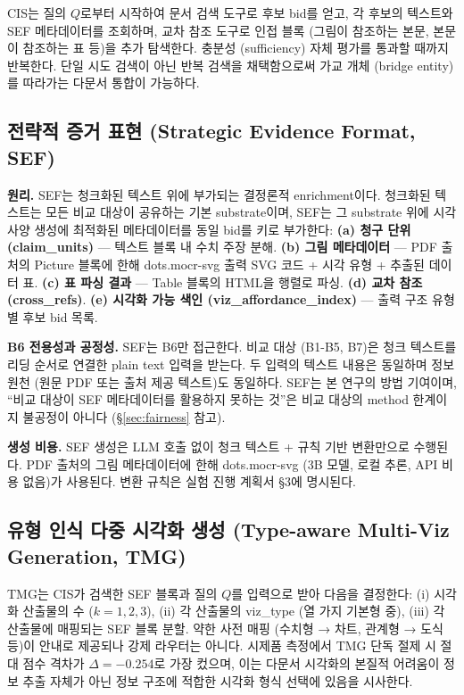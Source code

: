 \documentclass[11pt]{article}
\begin{document}
CIS는 질의 $Q$로부터 시작하여 문서 검색 도구로 후보 bid를 얻고, 각 후보의 텍스트와 SEF 메타데이터를 조회하며, 교차 참조 도구로 인접 블록 (그림이 참조하는 본문, 본문이 참조하는 표 등)을 추가 탐색한다. 충분성 (sufficiency) 자체 평가를 통과할 때까지 반복한다. 단일 시도 검색이 아닌 반복 검색을 채택함으로써 가교 개체 (bridge entity)를 따라가는 다문서 통합이 가능하다.

\subsection{전략적 증거 표현 (Strategic Evidence Format, SEF)}
\label{sec:sef}

\textbf{원리.} SEF는 청크화된 텍스트 위에 부가되는 결정론적 enrichment이다. 청크화된 텍스트는 모든 비교 대상이 공유하는 기본 substrate이며, SEF는 그 substrate 위에 시각 사양 생성에 최적화된 메타데이터를 동일 bid를 키로 부가한다: \textbf{(a) 청구 단위 (claim\_units)} — 텍스트 블록 내 수치 주장 분해. \textbf{(b) 그림 메타데이터} — PDF 출처의 Picture 블록에 한해 dots.mocr-svg 출력 SVG 코드 + 시각 유형 + 추출된 데이터 표. \textbf{(c) 표 파싱 결과} — Table 블록의 HTML을 행렬로 파싱. \textbf{(d) 교차 참조 (cross\_refs)}. \textbf{(e) 시각화 가능 색인 (viz\_affordance\_index)} — 출력 구조 유형별 후보 bid 목록.

\textbf{B6 전용성과 공정성.} SEF는 B6만 접근한다. 비교 대상 (B1-B5, B7)은 청크 텍스트를 리딩 순서로 연결한 plain text 입력을 받는다. 두 입력의 텍스트 내용은 동일하며 정보 원천 (원문 PDF 또는 출처 제공 텍스트)도 동일하다. SEF는 본 연구의 방법 기여이며, ``비교 대상이 SEF 메타데이터를 활용하지 못하는 것''은 비교 대상의 method 한계이지 불공정이 아니다 (\S\ref{sec:fairness} 참고).

\textbf{생성 비용.} SEF 생성은 LLM 호출 없이 청크 텍스트 + 규칙 기반 변환만으로 수행된다. PDF 출처의 그림 메타데이터에 한해 dots.mocr-svg (3B 모델, 로컬 추론, API 비용 없음)가 사용된다. 변환 규칙은 실험 진행 계획서 \S 3에 명시된다.

\subsection{유형 인식 다중 시각화 생성 (Type-aware Multi-Viz Generation, TMG)}

TMG는 CIS가 검색한 SEF 블록과 질의 $Q$를 입력으로 받아 다음을 결정한다: (i) 시각화 산출물의 수 ($k=1, 2, 3$), (ii) 각 산출물의 viz\_type (열 가지 기본형 중), (iii) 각 산출물에 매핑되는 SEF 블록 분할. 약한 사전 매핑 (수치형 → 차트, 관계형 → 도식 등)이 안내로 제공되나 강제 라우터는 아니다. 시제품 측정에서 TMG 단독 절제 시 절대 점수 격차가 $\Delta=-0.254$로 가장 컸으며, 이는 다문서 시각화의 본질적 어려움이 정보 추출 자체가 아닌 정보 구조에 적합한 시각화 형식 선택에 있음을 시사한다.
\end{document}

